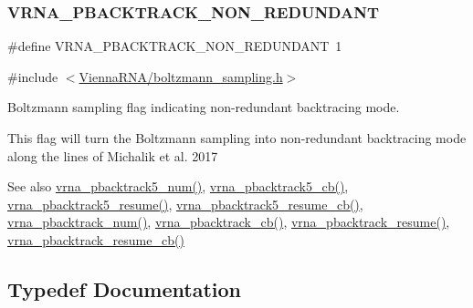 \subsubsection{\texorpdfstring{VRNA\_PBACKTRACK\_NON\_REDUNDANT}{VRNA\_PBACKTRACK\_NON\_REDUNDANT}}
{\footnotesize\ttfamily \#define V\+R\+N\+A\+\_\+\+P\+B\+A\+C\+K\+T\+R\+A\+C\+K\+\_\+\+N\+O\+N\+\_\+\+R\+E\+D\+U\+N\+D\+A\+NT~1}



{\ttfamily \#include $<$\mbox{\hyperlink{boltzmann__sampling_8h}{Vienna\+R\+N\+A/boltzmann\+\_\+sampling.\+h}}$>$}



Boltzmann sampling flag indicating non-\/redundant backtracing mode. 

This flag will turn the Boltzmann sampling into non-\/redundant backtracing mode along the lines of Michalik et al. 2017 \cite{michalik:2017}

\begin{DoxySeeAlso}{See also}
\mbox{\hyperlink{group__subopt__stochbt_ga30c3ddff868c44eecfdb07d99a2422ba}{vrna\+\_\+pbacktrack5\+\_\+num()}}, \mbox{\hyperlink{group__subopt__stochbt_ga626beb5b5b962d7e7c8433cd2cfd4e93}{vrna\+\_\+pbacktrack5\+\_\+cb()}}, \mbox{\hyperlink{group__subopt__stochbt_gac5d7065196975b803daeb4e094ba1cb9}{vrna\+\_\+pbacktrack5\+\_\+resume()}}, \mbox{\hyperlink{group__subopt__stochbt_ga4a91dc092580faf7799476e8dd76e0ac}{vrna\+\_\+pbacktrack5\+\_\+resume\+\_\+cb()}}, \mbox{\hyperlink{group__subopt__stochbt_ga596ed9bcd86f629a7c7c59c58b297db5}{vrna\+\_\+pbacktrack\+\_\+num()}}, \mbox{\hyperlink{group__subopt__stochbt_ga843fa953a15337b15cc68401adad84d7}{vrna\+\_\+pbacktrack\+\_\+cb()}}, \mbox{\hyperlink{group__subopt__stochbt_gae175129ece546fe7c092f27072e039d1}{vrna\+\_\+pbacktrack\+\_\+resume()}}, \mbox{\hyperlink{group__subopt__stochbt_ga6fc5ce952995e53baef52cad5581c063}{vrna\+\_\+pbacktrack\+\_\+resume\+\_\+cb()}} 
\end{DoxySeeAlso}


\subsection{Typedef Documentation}
\mbox{\label{group__subopt__stochbt_gad5bd9c8b195dd9cde15389f0042f0e44}} 
